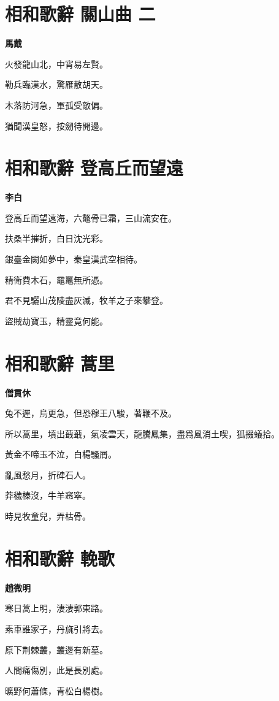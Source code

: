 \documentclass[12pt,a4paper]{ctexbook}
\begin{document}
\section{相和歌辭 關山曲 二}
\textbf{馬戴}\par\vspace{0.5em}
火發龍山北，中宵易左賢。\par
勒兵臨漢水，驚雁散胡天。\par
木落防河急，軍孤受敵偏。\par
猶聞漢皇怒，按劒待開邊。\par

\section{相和歌辭 登高丘而望遠}
\textbf{李白}\par\vspace{0.5em}
登高丘而望遠海，六鼇骨已霜，三山流安在。\par
扶桑半摧折，白日沈光彩。\par
銀臺金闕如夢中，秦皇漢武空相待。\par
精衛費木石，黿鼉無所憑。\par
君不見驪山茂陵盡灰滅，牧羊之子來攀登。\par
盜賊劫寶玉，精靈竟何能。\par

\section{相和歌辭 蒿里}
\textbf{僧貫休}\par\vspace{0.5em}
兔不遲，烏更急，但恐穆王八駿，著鞭不及。\par
所以蒿里，墳出蕺蕺，氣凌雲天，龍騰鳳集，盡爲風消土喫，狐掇蟻拾。\par
黃金不啼玉不泣，白楊騷屑。\par
亂風愁月，折碑石人。\par
莽穢榛沒，牛羊窸窣。\par
時見牧童兒，弄枯骨。\par

\section{相和歌辭 輓歌}
\textbf{趙微明}\par\vspace{0.5em}
寒日蒿上明，淒淒郭東路。\par
素車誰家子，丹旐引將去。\par
原下荆棘叢，叢邊有新墓。\par
人間痛傷別，此是長別處。\par
曠野何蕭條，青松白楊樹。\par
\end{document}
